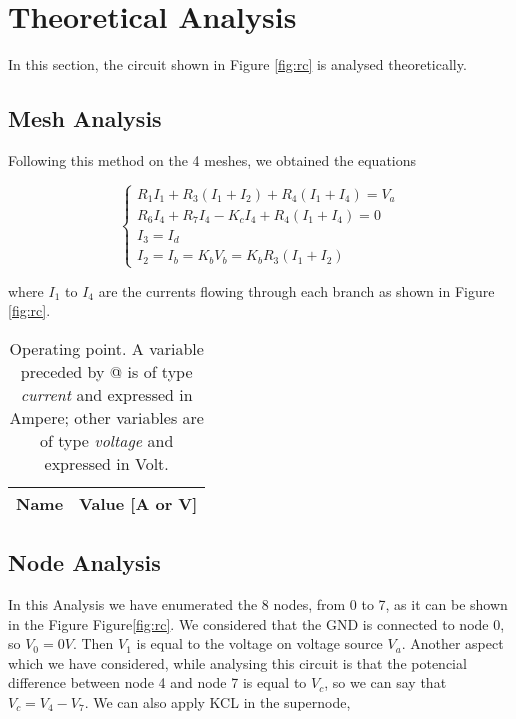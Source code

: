 \section{Theoretical Analysis}
\label{sec:analysis}

In this section, the circuit shown in Figure \ref{fig:rc} is analysed
theoretically.

\subsection{Mesh Analysis}
Following this method on the 4 meshes, we obtained the equations

\begin{equation}
\begin{cases}
R_1 I_1 + R_3 (I_1+I_2)+R_4(I_1+I_4)=V_a\\
R_6 I_4 + R_7 I_4 -K_c I_4 + R_4 (I_1+I_4)=0\\
I_3=I_d\\
I_2=I_b=K_b V_b = K_b R_3 (I_1+I_2)
\end{cases}
\end{equation}

where $I_1$ to $I_4$ are the currents flowing through each branch as shown in Figure \ref{fig:rc}.

\begin{table}[h]
  \centering
  \begin{tabular}{|l|r|}
    \hline    
    {\bf Name} & {\bf Value [A or V]} \\ \hline
    
 \end{tabular}
 \caption{Operating point. A variable preceded by @ is of type {\em current}
   and expressed in Ampere; other variables are of type {\it voltage} and expressed in
   Volt.}
  \label{tab:op}
\end{table}

\subsection{Node Analysis}
In this Analysis we have enumerated the 8 nodes, from 0 to 7, as it can be shown in the Figure Figure\ref{fig:rc}. We considered that the GND is connected to node 0, so $V_{0}=0V$. Then $V_1$ is equal to the voltage on voltage source $V_a$. Another aspect which we have considered, while analysing this circuit is that the potencial difference between node 4 and node 7 is equal to $V_c$, so we can say that $V_c=V_4-V_7$. We can also apply KCL in the supernode, 


